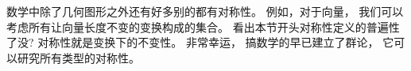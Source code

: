 
数学中除了几何图形之外还有好多别的都有对称性。 例如，对于向量， 我们可以考虑所有让向量长度不变的变换构成的集合。 看出本节开头对称性定义的普遍性了没? 对称性就是变换下的不变性。 非常幸运， 搞数学的早已建立了群论， 它可以研究所有类型的对称性。

